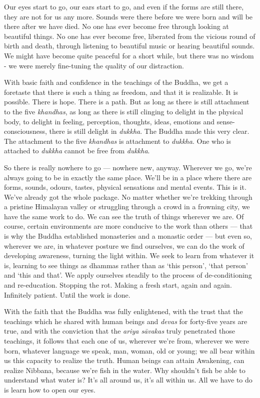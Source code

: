 Our eyes start to go, our ears start to go, and even if the forms are
still there, they are not for us any more. Sounds were there before we
were born and will be there after we have died. No one has ever become
free through looking at beautiful things. No one has ever become free,
liberated from the vicious round of birth and death, through listening
to beautiful music or hearing beautiful sounds. We might have become
quite peaceful for a short while, but there was no wisdom - we were
merely fine-tuning the quality of our distraction.

With basic faith and confidence in the teachings of the Buddha, we get a
foretaste that there is such a thing as freedom, and that it is
realizable. It is possible. There is hope. There is a path. But as long
as there is still attachment to the five \emph{khandhas}, as long as
there is still clinging to delight in the physical body, to delight in
feeling, perception, thoughts, ideas, emotions and sense-consciousness,
there is still delight in \emph{dukkha}. The Buddha made this very
clear. The attachment to the five \emph{khandhas} is attachment to
\emph{dukkha}. One who is attached to \emph{dukkha} cannot be free from
\emph{dukkha}.

So there is really nowhere to go --- nowhere new, anyway. Wherever we
go, we're always going to be in exactly the same place. We'll be in a
place where there are forms, sounds, odours, tastes, physical sensations
and mental events. This is it. We've already got the whole package. No
matter whether we're trekking through a pristine Himalayan valley or
struggling through a crowd in a frowning city, we have the same work to
do. We can see the truth of things wherever we are. Of course, certain
environments are more conducive to the work than others --- that is why
the Buddha established monasteries and a monastic order --- but even so,
wherever we are, in whatever posture we find ourselves, we can do the
work of developing awareness, turning the light within. We seek to learn
from whatever it is, learning to see things as dhammas rather than as
`this person', `that person' and `this and that'. We apply ourselves
steadily to the process of de-conditioning and re-education. Stopping
the rot. Making a fresh start, again and again. Infinitely patient.
Until the work is done.

With the faith that the Buddha was fully enlightened, with the trust
that the teachings which he shared with human beings and \emph{devas}
for forty-five years are true, and with the conviction that the
\emph{ariya sāvakas} truly penetrated those teachings, it follows that
each one of us, wherever we're from, wherever we were born, whatever
language we speak, man, woman, old or young; we all bear within us this
capacity to realize the truth. Human beings can attain Awakening, can
realize Nibbana, because we're fish in the water. Why shouldn't fish be
able to understand what water is? It's all around us, it's all within
us. All we have to do is learn how to open our eyes.

